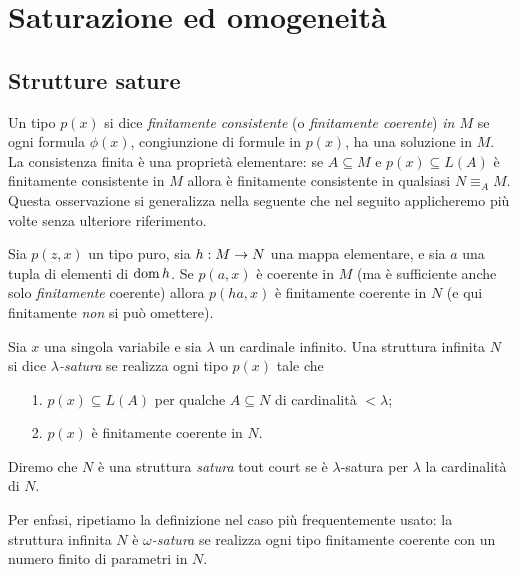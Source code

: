 \chapter{Saturazione ed omogeneit\`a}
\label{saturazione}
 
\def\ceq#1#2#3{\parbox{20ex}{$\displaystyle #1$}\parbox{6ex}{\hfil$\displaystyle #2$}$\displaystyle  #3$}

\section{Strutture sature}

Un tipo $p(x)$ si dice \emph{finitamente consistente\/} (o \emph{finitamente coerente\/}) \emph{in $M$\/} se ogni formula $\phi(x)$, congiunzione di formule in $p(x)$, ha una soluzione in $M$. La consistenza finita \`e una propriet\`a elementare: se $A\subseteq M$ e $p(x)\subseteq L(A)$ \`e finitamente consistente in $M$ allora \`e finitamente consistente in qualsiasi $N\equiv_A M$. Questa osservazione si generalizza nella seguente che nel seguito applicheremo pi\`u volte senza ulteriore riferimento.

\begin{remark}
Sia $p(z,x)$ un tipo puro, sia $h:M\rightarrow N$ una mappa elementare, e sia $a$ una tupla di elementi di $\mathop{\rm dom} h$. Se $p(a,x)$ \`e coerente in $M$ (ma \`e sufficiente anche solo \textit{finitamente\/} coerente) allora $p(ha,x)$ \`e finitamente coerente in $N$ (e qui finitamente \textit{non\/} si pu\`o omettere).\QED
\end{remark}

\begin{definition}
Sia $x$ una singola variabile e sia $\lambda$ un cardinale infinito. Una struttura infinita $N$ si dice \emph{$\lambda$-satura} se realizza ogni tipo $p(x)$ tale che
\begin{itemize}
\item[1.] $p(x)\subseteq L(A)$ per qualche $A\subseteq N$ di cardinalit\`a $<\lambda$;
\item[2.] $p(x)$ \`e finitamente coerente in $N$.
\end{itemize}
Diremo che $N$ \`e una struttura \emph{satura\/} tout court se \`e $\lambda$-satura per $\lambda$ la cardinalit\`a di $N$.
\end{definition}

Per enfasi, ripetiamo la definizione nel caso pi\`u frequentemente usato: la struttura infinita $N$ \`e \emph{$\omega$-satura} se realizza ogni tipo finitamente coerente con un numero finito di parametri in $N$. 

